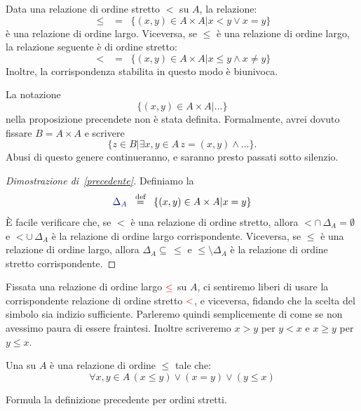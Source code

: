 \begin{proposition}\label{precedente}
	Data una relazione di ordine stretto $<$ su $A$, la relazione:
	\[ \leq \;\;=\;\; \{(x,y) \in A \times A | x < y \lor x = y\} \]
	\`e una relazione di ordine largo. Viceversa, se $\leq$ \`e una
relazione di ordine largo, la relazione seguente \`e di ordine stretto:
	\[ < \;\;=\;\; \{(x,y) \in A \times A | x \leq y \land x \ne y\}
		\]
	Inoltre, la corrispondenza stabilita in questo modo \`e biunivoca.
\end{proposition}

\begin{note}
La notazione
\[\{(x,y)\in A \times A | \dotsc\}\]
nella proposizione precendete non \`e stata definita. Formalmente, avrei
dovuto fissare $B=A\times A$ e scrivere
\[\{z \in B | \exists x,y \in A \, z=(x,y)\land \dotsc\}.\]
Abusi di questo genere continueranno, e saranno presto passati sotto
silenzio.
\end{note}

\begin{proof}[Dimostrazione di~\ref{precedente}]
	Definiamo la 
	\[ {\drkblu \Delta_A} \;\;\Mydef\;\; \{(x,y) \in A \times A | x = y\}
		\]
	\`E facile verificare che, se $<$ \`e una relazione di ordine
stretto, allora $< \cap \,\Delta_A = \emptyset$ e $< \cup \,\Delta_A$ \`e
la relazione di ordine largo corrispondente.
	Viceversa, se $\leq$ \`e una relazione di ordine largo, allora $\Delta_A \subseteq \, \leq$ e $\leq \setminus \Delta_A$ \`e la relazione di ordine stretto corrispondente.
\end{proof}

\begin{notation}
	Fissata una relazione di ordine largo $\textcolor{red}{\leq}$ su
$A$, ci sentiremo liberi di usare la corrispondente relazione di ordine
stretto $\textcolor{red}{<}$, e viceversa, fidando che la scelta del simbolo sia indizio sufficiente.
Parleremo quindi semplicemente di  come se non
avessimo paura di essere fraintesi.
	Inoltre scriveremo $x > y$ per $y < x$ e $x \geq y$ per $y \leq x$.
\end{notation}

\begin{definition}
	Una  su $A$ \`e una relazione di ordine $\leq$ tale che:
	\[ \forall x,y \in A \, (x \leq y) \lor (x = y) \lor (y \leq x)
		\]
\end{definition}

\begin{exercise}
	Formula la definizione precedente per ordini stretti.
\end{exercise}

